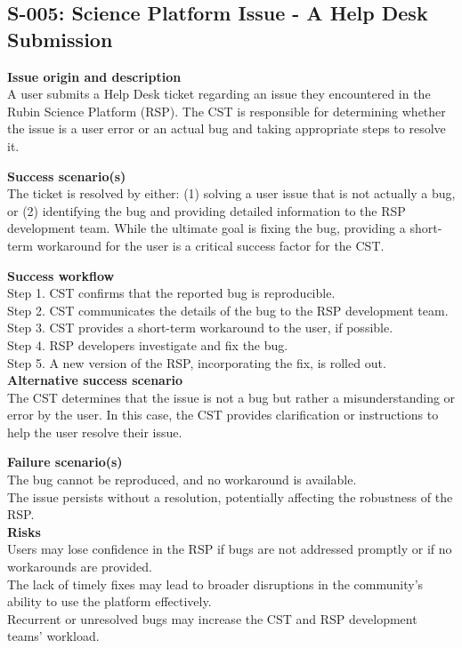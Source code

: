 \subsection{S-005: Science Platform Issue - A Help Desk Submission}

\textbf{Issue origin and description} \\
A user submits a Help Desk ticket regarding an issue they encountered in the Rubin Science Platform (RSP).
The CST is responsible for determining whether the issue is a user error or an actual bug and taking appropriate steps to resolve it.

\textbf{Success scenario(s)} \\
The ticket is resolved by either: (1) solving a user issue that is not actually a bug, or (2) identifying the bug and providing detailed information to the RSP development team.
While the ultimate goal is fixing the bug, providing a short-term workaround for the user is a critical success factor for the CST.

\textbf{Success workflow} \\
Step 1. CST confirms that the reported bug is reproducible. \\
Step 2. CST communicates the details of the bug to the RSP development team. \\
Step 3. CST provides a short-term workaround to the user, if possible. \\
Step 4. RSP developers investigate and fix the bug. \\
Step 5. A new version of the RSP, incorporating the fix, is rolled out. \\

\textbf{Alternative success scenario} \\
The CST determines that the issue is not a bug but rather a misunderstanding or error by the user.
In this case, the CST provides clarification or instructions to help the user resolve their issue.

\textbf{Failure scenario(s)} \\
The bug cannot be reproduced, and no workaround is available. \\
The issue persists without a resolution, potentially affecting the robustness of the RSP.\\

\textbf{Risks} \\
Users may lose confidence in the RSP if bugs are not addressed promptly or if no workarounds are provided. \\
The lack of timely fixes may lead to broader disruptions in the community's ability to use the platform effectively. \\
Recurrent or unresolved bugs may increase the CST and RSP development teams' workload.\\

